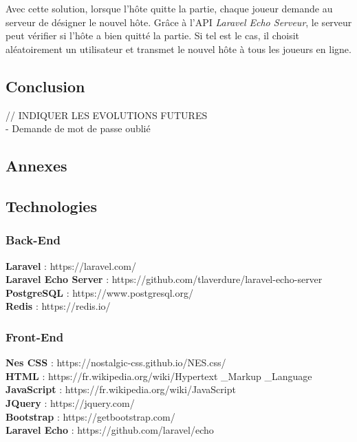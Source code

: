 \documentclass{tnreport}
\begin{document}
Avec cette solution, lorsque l'hôte quitte la partie, chaque joueur demande au serveur de désigner le nouvel hôte. Grâce à l'API \textit{Laravel Echo Serveur}, le serveur peut vérifier si l'hôte a bien quitté la partie. Si tel est le cas, il choisit aléatoirement un utilisateur et transmet le nouvel hôte à tous les joueurs en ligne.\\

\cleardoublepage

\chapter{Conclusion}

// INDIQUER LES EVOLUTIONS FUTURES \\
 - Demande de mot de passe oublié

\cleardoublepage

\begin{otherlanguage}{british}
\listoffigures

\cleardoublepage

\appendix
\part*{Annexes}
\end{otherlanguage}

\cleardoublepage

\chapter{Technologies}

\section{Back-End}
\textbf{Laravel} : https://laravel.com/\\
\textbf{Laravel Echo Server} : https://github.com/tlaverdure/laravel-echo-server\\
\textbf{PostgreSQL} : https://www.postgresql.org/\\
\textbf{Redis} : https://redis.io/\\

\section{Front-End}
\textbf{Nes CSS} : https://nostalgic-css.github.io/NES.css/\\
\textbf{HTML} : https://fr.wikipedia.org/wiki/Hypertext \_Markup \_Language\\
\textbf{JavaScript} : https://fr.wikipedia.org/wiki/JavaScript\\
\textbf{JQuery} : https://jquery.com/\\
\textbf{Bootstrap} : https://getbootstrap.com/\\
\textbf{Laravel Echo} : https://github.com/laravel/echo\\
\end{document}
